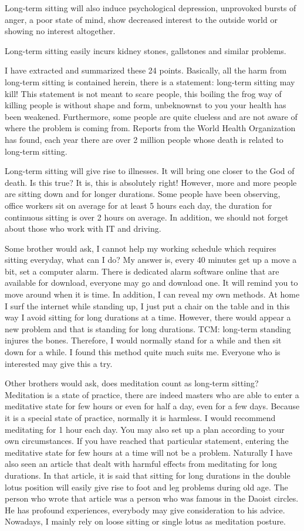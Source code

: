 \documentclass[
]{book}
\begin{document}
Long-term sitting will also induce psychological depression, unprovoked bursts of anger, a poor state of mind, show decreased interest to the outside world or showing no interest altogether.

Long-term sitting easily incurs kidney stones, gallstones and similar problems.

I have extracted and summarized these 24 points. Basically, all the harm from long-term sitting is contained herein, there is a statement: long-term sitting may kill! This statement is not meant to scare people, this boiling the frog way of killing people is without shape and form, unbeknownst to you your health has been weakened. Furthermore, some people are quite clueless and are not aware of where the problem is coming from. Reports from the World Health Organization has found, each year there are over 2 million people whose death is related to long-term sitting.

Long-term sitting will give rise to illnesses. It will bring one closer to the God of death. Is this true? It is, this is absolutely right! However, more and more people are sitting down and for longer durations. Some people have been observing, office workers sit on average for at least 5 hours each day, the duration for continuous sitting is over 2 hours on average. In addition, we should not forget about those who work with IT and driving.

Some brother would ask, I cannot help my working schedule which requires sitting everyday, what can I do? My answer is, every 40 minutes get up a move a bit, set a computer alarm. There is dedicated alarm software online that are available for download, everyone may go and download one. It will remind you to move around when it is time. In addition, I can reveal my own methods. At home I surf the internet while standing up, I just put a chair on the table and in this way I avoid sitting for long durations at a time. However, there would appear a new problem and that is standing for long durations. TCM: long-term standing injures the bones. Therefore, I would normally stand for a while and then sit down for a while. I found this method quite much suits me. Everyone who is interested may give this a try.

Other brothers would ask, does meditation count as long-term sitting? Meditation is a state of practice, there are indeed masters who are able to enter a meditative state for few hours or even for half a day, even for a few days. Because it is a special state of practice, normally it is harmless. I would recommend meditating for 1 hour each day. You may also set up a plan according to your own circumstances. If you have reached that particular statement, entering the meditative state for few hours at a time will not be a problem. Naturally I have also seen an article that dealt with harmful effects from meditating for long durations. In that article, it is said that sitting for long durations in the double lotus position will easily give rise to foot and leg problems during old age. The person who wrote that article was a person who was famous in the Daoist circles. He has profound experiences, everybody may give consideration to his advice. Nowadays, I mainly rely on loose sitting or single lotus as meditation posture.
\end{document}
